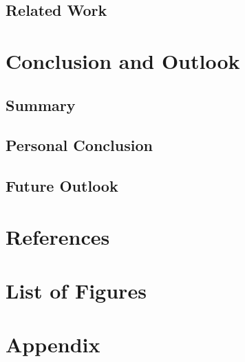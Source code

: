 \documentclass[11pt, a4paper, oneside, draft]{scrartcl}
\begin{document}
        \subsection{Related Work}

    \section{Conclusion and Outlook}

        \subsection{Summary}

        \subsection{Personal Conclusion}

        \subsection{Future Outlook}

    \section*{References}
        \printbibliography[heading=none]

    \section*{List of Figures}
        \begingroup
            \renewcommand{\listfigurename}{} %
            \listoffigures
        \endgroup

    \section*{Appendix}
\end{document}
